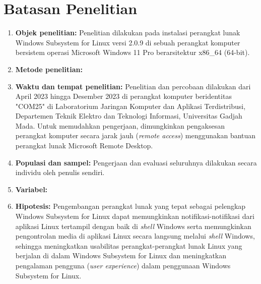 
\section{Batasan Penelitian}

\begin{enumerate}
    \item \textbf{Objek penelitian:} Penelitian dilakukan pada instalasi perangkat lunak Windows Subsystem for Linux versi 2.0.9 di sebuah perangkat komputer bersistem operasi Microsoft Windows 11 Pro berarsitektur x86\_64 (64-bit).
    
    \item \textbf{Metode penelitian:} 
    
    \item \textbf{Waktu dan tempat penelitian:} Penelitian dan percobaan dilakukan dari April 2023 hingga Desember 2023 di perangkat komputer beridentitas "COM25" di Laboratorium Jaringan Komputer dan Aplikasi Terdistribusi, Departemen Teknik Elektro dan Teknologi Informasi, Universitas Gadjah Mada. Untuk memudahkan pengerjaan, dimungkinkan pengaksesan perangkat komputer secara jarak jauh (\textit{remote access}) menggunakan bantuan perangkat lunak Microsoft Remote Desktop.
    
    \item \textbf{Populasi dan sampel:} Pengerjaan dan evaluasi seluruhnya dilakukan secara individu oleh penulis sendiri.
    
    \item \textbf{Variabel:} 
    
    \item \textbf{Hipotesis:} Pengembangan perangkat lunak yang tepat sebagai pelengkap Windows Subsystem for Linux dapat memungkinkan notifikasi-notifikasi dari aplikasi Linux tertampil dengan baik di \textit{shell} Windows serta memungkinkan pengontrolan media di aplikasi Linux secara langsung melalui \textit{shell} Windows, sehingga meningkatkan usabilitas perangkat-perangkat lunak Linux yang berjalan di dalam Windows Subsystem for Linux dan meningkatkan pengalaman pengguna (\textit{user experience}) dalam penggunaan Windows Subsystem for Linux.

    

\end{enumerate}
